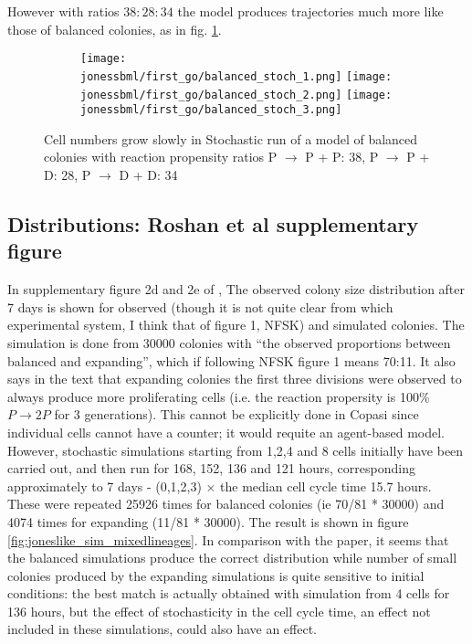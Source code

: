 \documentclass[a4paper,10pt]{report}
\newcommand{\psortbase}{/home/ngrs2/work/bsu/PSORT_Zuliani_Reynolds/}
\newcommand{\sbmlbase}{\psortbase/sbml-sh/}
\newcommand{\jonessbml}{\sbmlbase/jones_like}
\begin{document}
However with ratios $38:28:34$ the model produces trajectories much more like those of balanced colonies, as in fig. \ref{fig:joneslike_fixed_balanced}.

\begin{figure}[h!]
  \begin{subfigure}{\textwidth}
    \texttt{[image: \\jonessbml/first\_go/balanced\_stoch\_1.png]}
    \texttt{[image: \\jonessbml/first\_go/balanced\_stoch\_2.png]}
    \texttt{[image: \\jonessbml/first\_go/balanced\_stoch\_3.png]}
  \end{subfigure}
  \caption{Cell numbers grow slowly in Stochastic run of a model of balanced colonies with reaction propensity ratios P $\rightarrow$ P + P: 38, P $\rightarrow$ P + D: 28, P $\rightarrow$ D + D: 34}
  \label{fig:joneslike_fixed_balanced}
\end{figure}

\subsection{Distributions: Roshan et al supplementary figure}

In supplementary figure 2d and 2e of \cite{roshan2016human}, The observed colony size distribution after 7 days is shown for observed (though it is not quite clear from which experimental system, I think that of figure 1, NFSK) and simulated colonies. The simulation is done from 30000 colonies with ``the observed proportions between balanced and expanding'', which if following NFSK figure 1 means 70:11. It also says in the text that expanding colonies the first three divisions were observed to always produce more proliferating cells (i.e. the reaction propersity is 100\% $P \rightarrow 2 P$ for 3 generations). This cannot be explicitly done in Copasi since individual cells cannot have a counter; it would requite an agent-based model. However, stochastic simulations starting from 1,2,4 and 8 cells initially have been carried out, and then run for 168, 152, 136 and 121 hours, corresponding approximately to 7 days - (0,1,2,3) $\times$ the median cell cycle time 15.7 hours.
These were repeated 25926 times for balanced colonies (ie 70/81 * 30000) and 4074 times for expanding (11/81 * 30000). The result is shown in figure  \ref{fig:joneslike_sim_mixedlineages}. In comparison with the paper, it seems that
the balanced simulations produce the correct distribution while number of small colonies produced by the expanding simulations is quite sensitive to initial conditions: the best match is actually obtained with simulation from 4 cells for 136 hours, but the effect of stochasticity in the cell cycle time, an effect not included in these simulations, could also have an effect. 
\end{document}
